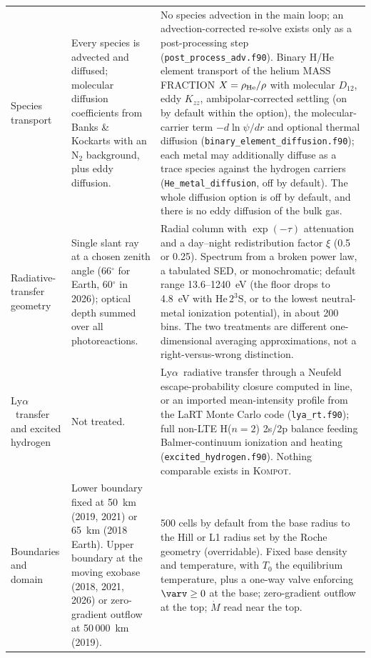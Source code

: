 \documentclass{my_memo}
\newcommand{\Kompot}{\textsc{Kompot}}
\newcommand{\Mdot}{\dot{M}}
\newcommand{\Lya}{Ly$\alpha$}
\newcommand{\Kzz}{K_{zz}}
\begin{document}
{\begin{longtable}{@{}L{0.155\textwidth}L{0.39\textwidth}L{0.39\textwidth}@{}}
Species transport &
Every species is advected and diffused; molecular diffusion coefficients from Banks \& Kockarts
with an N$_2$ background, plus eddy diffusion. &
No species advection in the main loop; an advection-corrected re-solve exists only as a
post-processing step (\texttt{post\_process\_adv.f90}). Binary H/He element transport of the
helium MASS FRACTION $X=\rho_{\rm He}/\rho$ with molecular $D_{12}$, eddy $\Kzz$,
ambipolar-corrected settling (on by default within the option), the molecular-carrier
term $-d\ln\psi/dr$ and optional thermal diffusion
(\texttt{binary\_element\_diffusion.f90}); each metal may additionally diffuse as a trace
species against the hydrogen carriers (\texttt{He\_metal\_diffusion}, off by default).
The whole diffusion option is off by default, and there is no eddy diffusion of the
bulk gas. \\

Radiative-transfer geometry &
Single slant ray at a chosen zenith angle (66$^\circ$ for Earth, 60$^\circ$ in 2026); optical
depth summed over all photoreactions. &
Radial column with $\exp(-\tau)$ attenuation and a day--night redistribution factor $\xi$ (0.5 or
0.25). Spectrum from a broken power law, a tabulated SED, or monochromatic; default range
13.6--1240~eV (the floor drops to 4.8~eV with He\,$2^3$S, or to the lowest neutral-metal
ionization potential), in about 200 bins. The two treatments are different one-dimensional
averaging approximations, not a right-versus-wrong distinction. \\

\Lya\ transfer and excited hydrogen &
Not treated. &
\Lya\ radiative transfer through a Neufeld escape-probability closure computed in line, or an
imported mean-intensity profile from the LaRT Monte Carlo code (\texttt{lya\_rt.f90}); full
non-LTE H($n=2$) 2s/2p balance feeding Balmer-continuum ionization and heating
(\texttt{excited\_hydrogen.f90}). Nothing comparable exists in \Kompot. \\

Boundaries and domain &
Lower boundary fixed at 50~km (2019, 2021) or 65~km (2018 Earth). Upper boundary at the moving
exobase (2018, 2021, 2026) or zero-gradient outflow at 50\,000~km (2019). &
500 cells by default from the base radius to the Hill or L1 radius set by the Roche geometry
(overridable). Fixed base density and temperature, with $T_0$ the equilibrium temperature, plus a
one-way valve enforcing $\varv \ge 0$ at the base; zero-gradient outflow at the top; $\Mdot$ read
near the top. \\


\end{longtable}}
\end{document}
